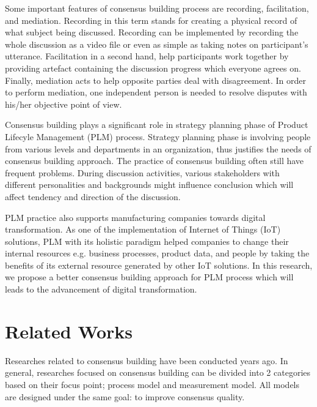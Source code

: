 \documentclass[10pt, conference, compsocconf]{IEEEtran}
\begin{document}
Some important features of consensus building process are recording, facilitation, and mediation\cite{b1}. Recording in this term stands for creating a physical record of what subject being discussed. Recording can be implemented by recording the whole discussion as a video file or even as simple as taking notes on participant's utterance. Facilitation in a second hand, help participants work together by providing artefact containing the discussion progress which everyone agrees on. Finally, mediation acts to help opposite parties deal with disagreement. In order to perform mediation, one independent person is needed to resolve disputes with his/her objective point of view.

Consensus building plays a significant role in strategy planning phase of Product Lifecyle Management (PLM) process\cite{b23}.  Strategy planning phase is involving people from various levels and departments in an organization\cite{b1}, thus justifies the needs of consensus building approach. The practice of consensus building often still have frequent problems. During discussion activities, various stakeholders with different personalities and backgrounds might influence conclusion\cite{b2} which will affect tendency and direction of the discussion\cite{b3}.

PLM practice also supports manufacturing companies towards digital transformation\cite{b24}. As one of the implementation of Internet of Things (IoT) solutions, PLM with its holistic paradigm helped companies to change their internal resources e.g. business processes, product data, and people by taking the benefits of its external resource generated by other IoT solutions. In this research, we propose a better consensus building approach for PLM process which will leads to the advancement of digital transformation.

\section{Related Works}
\label{sec_rp}
Researches related to consensus building have been conducted years ago. In general, researches focused on consensus building can be divided into 2 categories based on their focus point; process model and measurement model. All models are designed under the same goal: to improve consensus quality.
\end{document}
